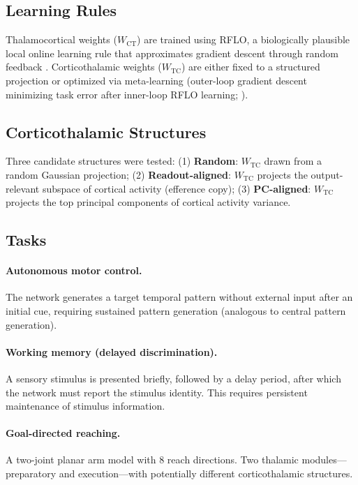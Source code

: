 \documentclass[11pt]{article}
\begin{document}
\subsection{Learning Rules}

Thalamocortical weights ($W_{\text{CT}}$) are trained using RFLO, a biologically plausible local online learning rule that approximates gradient descent through random feedback \citep{murray2019local, lillicrap2016random}. Corticothalamic weights ($W_{\text{TC}}$) are either fixed to a structured projection or optimized via meta-learning (outer-loop gradient descent minimizing task error after inner-loop RFLO learning; \citealt{finn2017model}).

\subsection{Corticothalamic Structures}

Three candidate structures were tested: (1) \textbf{Random}: $W_{\text{TC}}$ drawn from a random Gaussian projection; (2) \textbf{Readout-aligned}: $W_{\text{TC}}$ projects the output-relevant subspace of cortical activity (efference copy); (3) \textbf{PC-aligned}: $W_{\text{TC}}$ projects the top principal components of cortical activity variance.

\subsection{Tasks}

\paragraph{Autonomous motor control.} The network generates a target temporal pattern without external input after an initial cue, requiring sustained pattern generation (analogous to central pattern generation).

\paragraph{Working memory (delayed discrimination).} A sensory stimulus is presented briefly, followed by a delay period, after which the network must report the stimulus identity. This requires persistent maintenance of stimulus information.

\paragraph{Goal-directed reaching.} A two-joint planar arm model with 8 reach directions. Two thalamic modules---preparatory and execution---with potentially different corticothalamic structures.
\end{document}
